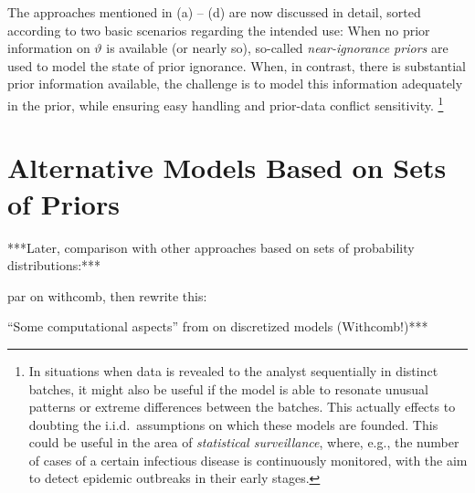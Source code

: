 The approaches mentioned in (a) -- (d) are now discussed in detail,
sorted according to two basic scenarios regarding the intended use:
When no prior information on $\vartheta$ is available (or nearly so),
so-called \emph{near-ignorance priors} are used to model the state of prior ignorance.
When, in contrast, there is substantial prior information available,
the challenge is to model this information adequately in the prior,
while ensuring easy handling and prior-data conflict sensitivity.%
\footnote{In situations when data is revealed to the analyst sequentially in distinct batches,
it might also be useful if the model is able to resonate unusual patterns or extreme differences between the batches.
This actually effects to doubting the i.i.d.\ assumptions on which these models are founded.
This could be useful in the area of \emph{statistical surveillance},
where, e.g., the number of cases of a certain infectious disease is continuously monitored,
with the aim to detect epidemic outbreaks in their early stages.}


\section{Alternative Models Based on Sets of Priors}
\label{sec:alternatives}

***Later, comparison with other approaches based on sets of probability distributions:***

\bigskip

par on withcomb, then rewrite this:

``Some computational aspects'' from \textcite[\S 4.2]{itip-statinf} on discretized models (Withcomb!)***


